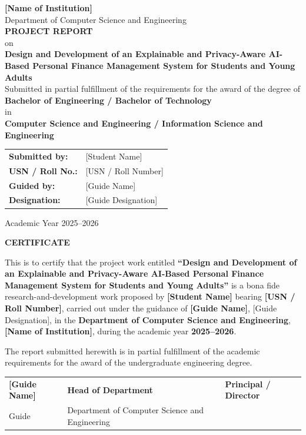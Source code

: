 \documentclass[12pt,a4paper]{report}
\newcommand{\ReportTitle}{Design and Development of an Explainable and Privacy-Aware AI-Based Personal Finance Management System for Students and Young Adults}
\newcommand{\StudentName}{[Student Name]}
\newcommand{\USN}{[USN / Roll Number]}
\newcommand{\DepartmentName}{Department of Computer Science and Engineering}
\newcommand{\CollegeName}{[Name of Institution]}
\newcommand{\GuideName}{[Guide Name]}
\newcommand{\GuideDesignation}{[Guide Designation]}
\newcommand{\AcademicYear}{2025--2026}
\begin{document}
\begin{titlepage}
\thispagestyle{empty}
\begin{center}
\vspace*{1.5cm}
{\Large \textbf{\CollegeName}}\\[1.0cm]
{\large \DepartmentName}\\[1.2cm]
{\Huge \textbf{PROJECT REPORT}}\\[0.7cm]
{\Large on}\\[0.6cm]
{\LARGE \textbf{\ReportTitle}}\\[1.2cm]
\vfill
{\large Submitted in partial fulfillment of the requirements for the award of the degree of}\\[0.4cm]
{\Large \textbf{Bachelor of Engineering / Bachelor of Technology}}\\[0.3cm]
{\large in}\\[0.3cm]
{\Large \textbf{Computer Science and Engineering / Information Science and Engineering}}\\[1.0cm]
\begin{tabular}{ll}
\textbf{Submitted by:} & \StudentName \\
\textbf{USN / Roll No.:} & \USN \\
\textbf{Guided by:} & \GuideName \\
\textbf{Designation:} & \GuideDesignation \\
\end{tabular}
\vfill
{\large Academic Year \AcademicYear}
\end{center}
\end{titlepage}

\cleardoublepage
\thispagestyle{empty}
\begin{center}
{\Large \textbf{CERTIFICATE}}\\[1cm]
\end{center}

\justifying
This is to certify that the project work entitled
\textbf{``\ReportTitle''}
is a bona fide research-and-development work proposed by
\textbf{\StudentName}
bearing
\textbf{\USN},
carried out under the guidance of
\textbf{\GuideName},
\GuideDesignation,
in the
\textbf{\DepartmentName},
\textbf{\CollegeName},
during the academic year
\textbf{\AcademicYear}.

The report submitted herewith is in partial fulfillment of the academic requirements for the award of the undergraduate engineering degree.

\vspace{2cm}
\begin{center}
\begin{tabular}{p{} p{} p{}}
\centering \textbf{\GuideName} &
\centering \textbf{Head of Department} &
\centering \textbf{Principal / Director} \tabularnewline[0.8em]
\centering Guide &
\centering \DepartmentName &
\centering \CollegeName \tabularnewline
\end{tabular}
\end{center}
\end{document}
